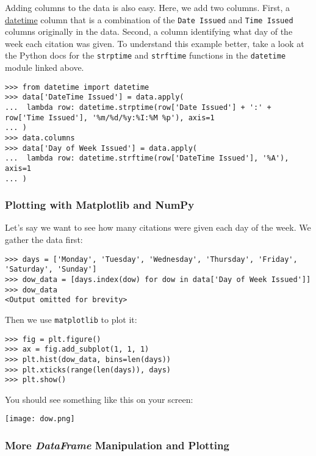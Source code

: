 Adding columns to the data is also easy. Here, we add two columns.
First, a
\href{https://docs.python.org/2/library/datetime.html}{datetime} column
that is a combination of the \texttt{Date\ Issued} and
\texttt{Time\ Issued} columns originally in the data. Second, a column
identifying what day of the week each citation was given. To understand
this example better, take a look at the Python docs for the
\texttt{strptime} and \texttt{strftime} functions in the
\texttt{datetime} module linked above.

\begin{lstlisting}
>>> from datetime import datetime
>>> data['DateTime Issued'] = data.apply(
...  lambda row: datetime.strptime(row['Date Issued'] + ':' + row['Time Issued'], '%m/%d/%y:%I:%M %p'), axis=1
... )
>>> data.columns
>>> data['Day of Week Issued'] = data.apply(
...  lambda row: datetime.strftime(row['DateTime Issued'], '%A'), axis=1
... )
\end{lstlisting}

\subsubsection{Plotting with Matplotlib and
NumPy}\label{plotting-with-matplotlib-and-numpy}

Let's say we want to see how many citations were given each day of the
week. We gather the data first:

\begin{lstlisting}
>>> days = ['Monday', 'Tuesday', 'Wednesday', 'Thursday', 'Friday', 'Saturday', 'Sunday']
>>> dow_data = [days.index(dow) for dow in data['Day of Week Issued']]
>>> dow_data
<Output omitted for brevity>
\end{lstlisting}

Then we use \texttt{matplotlib} to plot it:

\begin{lstlisting}
>>> fig = plt.figure()
>>> ax = fig.add_subplot(1, 1, 1)
>>> plt.hist(dow_data, bins=len(days))
>>> plt.xticks(range(len(days)), days)
>>> plt.show()
\end{lstlisting}

You should see something like this on your screen:

\texttt{[image: dow.png]}

\subsubsection{\texorpdfstring{More \emph{DataFrame} Manipulation and
Plotting}{More DataFrame Manipulation and Plotting}}\label{more-dataframe-manipulation-and-plotting}

